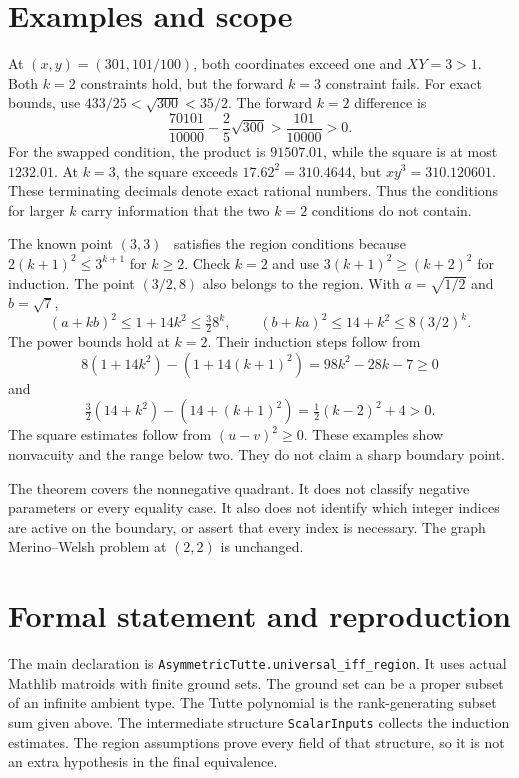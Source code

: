 \documentclass[11pt,a4paper]{article}
\begin{document}
\section{Examples and scope}\label{sec:examples}
At $(x,y)=(301,101/100)$, both coordinates exceed one and $XY=3>1$.
Both $k=2$ constraints hold, but the forward $k=3$ constraint fails.
For exact bounds, use $433/25<\sqrt{300}<35/2$.
The forward $k=2$ difference is
\[
\frac{70101}{10000}-\frac25\sqrt{300}>\frac{101}{10000}>0.
\]
For the swapped condition, the product is $91507.01$, while the square
is at most $1232.01$. At $k=3$, the square exceeds
$17.62^2=310.4644$, but $xy^3=310.120601$.
These terminating decimals denote exact rational numbers.
Thus the conditions for larger $k$ carry information that the two
$k=2$ conditions do not contain.

The known point $(3,3)$~\cite{Jackson} satisfies the region conditions because
$2(k+1)^2\leq3^{k+1}$ for $k\geq2$. Check $k=2$ and use
$3(k+1)^2\geq(k+2)^2$ for induction. The point $(3/2,8)$ also belongs
to the region. With $a=\sqrt{1/2}$ and $b=\sqrt7$,
\[
(a+kb)^2\leq1+14k^2\leq\tfrac32 8^k,
\qquad (b+ka)^2\leq14+k^2\leq8(3/2)^k.
\]
The power bounds hold at $k=2$. Their induction steps follow from
\[
8(1+14k^2)-(1+14(k+1)^2)=98k^2-28k-7\geq0
\]
and
\[
\tfrac32(14+k^2)-(14+(k+1)^2)=\tfrac12(k-2)^2+4>0.
\]
The square estimates follow from $(u-v)^2\geq0$.
These examples show nonvacuity and the range below two. They do not
claim a sharp boundary point.

The theorem covers the nonnegative quadrant. It does not classify negative
parameters or every equality case. It also does not identify which
integer indices are active on the boundary, or assert that every index
is necessary. The graph Merino--Welsh problem at $(2,2)$ is unchanged.

\section{Formal statement and reproduction}\label{sec:formal}
The main declaration is \texttt{AsymmetricTutte.universal\_iff\_region}.
It uses actual Mathlib matroids with finite ground sets. The ground set
can be a proper subset of an infinite ambient type.
The Tutte polynomial is the rank-generating subset sum given above.
The intermediate structure \texttt{ScalarInputs} collects the induction
estimates. The region assumptions prove every field of that structure,
so it is not an extra hypothesis in the final equivalence.
\end{document}
